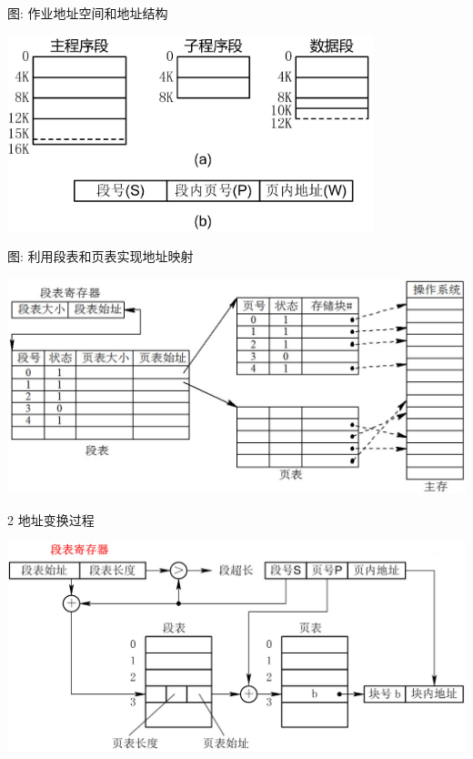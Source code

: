 \begin{frame}[fragile]{图: 作业地址空间和地址结构}
   \begin{center}
    \includegraphics[width=0.8\textwidth]{figure/mem_seg5.jpg}
  \end{center}
\end{frame}


\begin{frame}[fragile]{图: 利用段表和页表实现地址映射}
 \begin{center}
    \includegraphics[width=1.0\textwidth]{figure/mem_seg6.jpg}
  \end{center}  
\end{frame}


\begin{frame}[fragile]{2 地址变换过程}
   \begin{center}
    \includegraphics[width=1.0\textwidth]{figure/mem_seg7.jpg}
  \end{center}  
\end{frame}


